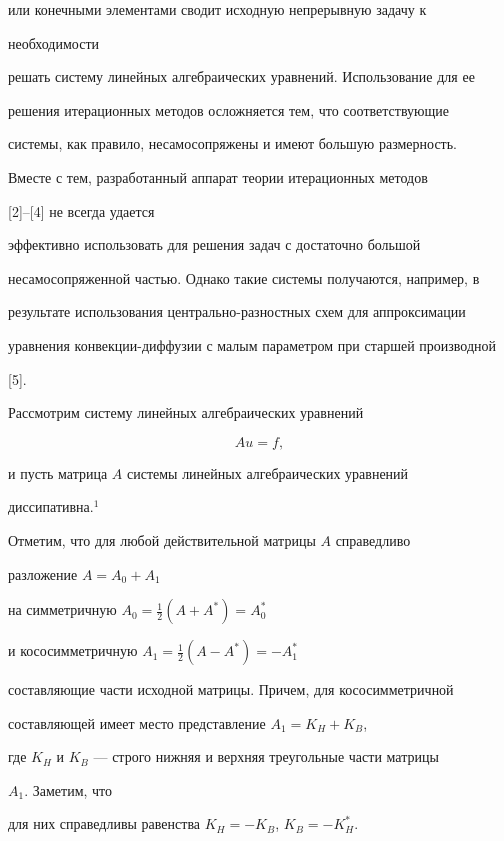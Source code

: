 или конечными элементами сводит исходную непрерывную задачу к 


необходимости 


решать систему линейных алгебраических уравнений. Использование для ее 


решения итерационных методов осложняется тем, что соответствующие 


системы, как правило, несамосопряжены и имеют большую размерность. 


Вместе с тем, разработанный аппарат теории итерационных методов 


[2]--[4] не всегда удается 


эффективно использовать для решения задач с достаточно большой 


несамосопряженной частью. Однако такие системы получаются, например, в 


результате использования центрально-разностных схем для аппроксимации 


уравнения конвекции-диффузии с малым параметром при старшей производной 


[5]. 


 


Рассмотрим систему линейных алгебраических уравнений 


\begin{equation} 


A u=f, 


\end{equation} 


и пусть матрица $A$ системы линейных алгебраических уравнений 


диссипативна.$^1$ 


Отметим, что для любой действительной матрицы $A$ справедливо 


разложение $A=A_0+A_1$ 


на симметричную $A_0=\frac{1}{2}(A+A^*)=A^*_0$ 


и кососимметричную $A_1=\frac{1}{2}(A-A^*)=-A^*_1$ 


составляющие части исходной матрицы. Причем, для кососимметричной 


составляющей имеет место представление $A_1=K_H+K_B$, 


где $K_H$ и $K_B$ --- строго нижняя и верхняя треугольные части матрицы 


$A_1$. Заметим, что 


для них справедливы равенства $K_H=-K_B$, $K_B=-K^*_H$. 



